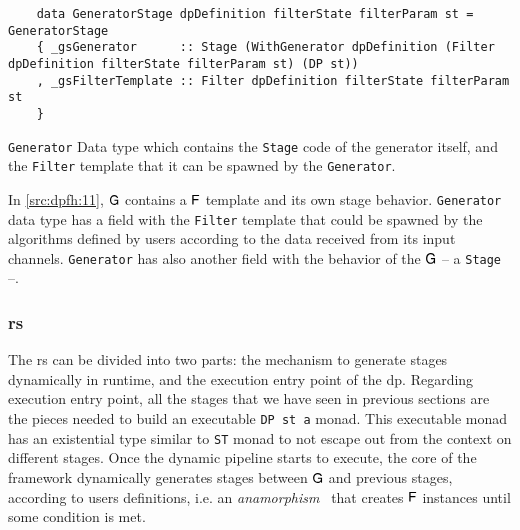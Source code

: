 \begin{listing}[H]
  \begin{verbatim}
    data GeneratorStage dpDefinition filterState filterParam st = GeneratorStage
    { _gsGenerator      :: Stage (WithGenerator dpDefinition (Filter dpDefinition filterState filterParam st) (DP st))
    , _gsFilterTemplate :: Filter dpDefinition filterState filterParam st
    }  
  \end{verbatim}
  \caption[{[\texttt{Stage.hs}] Generator}]{\texttt{Generator} Data type which contains the \texttt{Stage} code of the generator itself, and the \texttt{Filter} template that it can be spawned by the \texttt{Generator}.}
  \label{src:dpfh:11}
\end{listing}

In \autoref{src:dpfh:11}, $\mathsf{G}$ contains a $\mathsf{F}$ template and its own stage behavior.
\texttt{Generator} data type has a field with the \texttt{Filter} template that could be spawned by the algorithms defined by users according to the data received from its input channels.
\texttt{Generator} has also another field with the behavior of the $\mathsf{G}$ -- a \texttt{Stage} --. 

\subsubsection{\texorpdfstring{\acrfull{rs}}{Lg}}
The \acrshort{rs} can be divided into two parts: the mechanism to generate stages dynamically in runtime, and the execution entry point of the \acrshort{dp}.
Regarding execution entry point, all the stages that we have seen in previous sections are the pieces needed to build an executable \texttt{DP st a} monad.
This executable monad has an existential type similar to \texttt{ST} monad to not escape out from the context on different stages.
Once the dynamic pipeline starts to execute, the core of the framework dynamically generates stages between $\mathsf{G}$ and previous stages, according to users definitions, i.e. an \emph{anamorphism}~\cite{lenses} that creates $\mathsf{F}$ instances until some condition is met.

